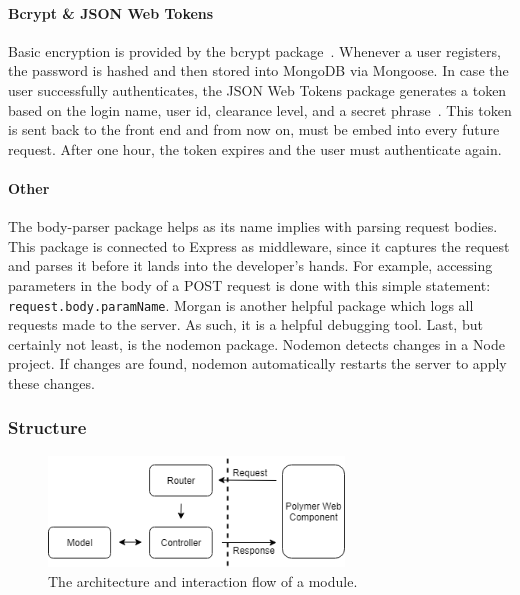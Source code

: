             \paragraph{Bcrypt \& JSON Web Tokens} Basic encryption is provided by the bcrypt package~\cite{Bcrypt}. Whenever a user registers, the password is hashed and then stored into MongoDB via Mongoose. In case the user successfully authenticates, the JSON Web Tokens package generates a token based on the login name, user id, clearance level, and a secret phrase~\cite{JWT}. This token is sent back to the front end and from now on, must be embed into every future request. After one hour, the token expires and the user must authenticate again.

            \paragraph{Other} The body-parser package helps as its name implies with parsing request bodies. This package is connected to Express as middleware, since it captures the request and parses it before it lands into the developer's hands. For example, accessing parameters in the body of a POST request is done with this simple statement: \texttt{request.body.paramName}. Morgan is another helpful package which logs all requests made to the server. As such, it is a helpful debugging tool. Last, but certainly not least, is the nodemon package. Nodemon detects changes in a Node project. If changes are found, nodemon automatically restarts the server to apply these changes.

        \subsubsection{Structure}\label{backend_structure}
        
        \begin{figure}[t]
            \centering
            \includegraphics[width=0.7\textwidth]{chapters/4_implementation/architecture}
            \caption{The architecture and interaction flow of a module.}\label{fig:architecture}
        \end{figure}

